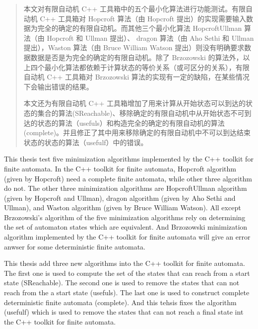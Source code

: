 \begin{abstract}
  本文对有限自动机 C++ 工具箱中的五个最小化算法进行功能测试。有限自动机 C++ 工具箱对 Hopcroft 算法（由 Hopcroft 提出）的实现需要输入数据为完全的确定的有限自动机。而其他三个最小化算法 HopcroftUllman 算法（由 Hopcroft 和 Ullman 提出）、 dragon 算法（由 Aho Sethi 和 Ullman 提出），Waston 算法（由 Bruce William Watson 提出）则没有明确要求数据数据是否是为完全的确定的有限自动机。除了 Brzozowski 的算法外，以上四个最小化算法都依赖于计算状态的等价关系（或可区分的关系），有限自动机 C++ 工具箱对 Brzozowski 算法的实现有一定的缺陷，在某些情况下会输出错误的结果。

  本文还为有限自动机 C++ 工具箱增加了用来计算从开始状态可以到达的状态的集合的算法(SReachable)、移除确定的有限自动机中从开始状态不可到达的状态的算法（usefuls）和构造完全的确定的有限自动机的算法(complete)。并且修正了其中用来移除确定的有限自动机中不可以到达结束状态的状态的算法（usefulf）中的错误。

\end{abstract}

\begin{enabstract}
  This thesis test five minimization algorithms implemented by the C++ toolkit for finite automata. In the C++ toolkit for finite automata, Hopcroft algorithm (given by Hopcroft) need a complete finite automata, while other three algorithm do not. The other three minimization algorithms are HopcroftUllman algorithm (given by Hopcroft and Ullman), dragon algorithm (given by Aho Sethi and Ullman), and Waston algorithm (given by Bruce William Watson). All except Brzozowski's algorithm of the five minimization algorithms rely on determining the set of automaton states which are equivalent. And Brzozowski minimization algorithm implemented by the C++ toolkit for finite automata will give an error anwser for some deterministic finite automata.
  
  This thesis add three new algorithms into the C++ toolkit for finite automata. The first one is used to compute the set of the states that can reach from a start state (SReachable). The second one is used to remove the states that can not reach from the a start state (usefuls). The last one is used to construct complete deterministic finite automata (complete). And this tehsis fixes the algorithm (usefulf) which is used to remove the states that can not reach a final state int the C++ toolkit for finite automata.
\end{enabstract}
